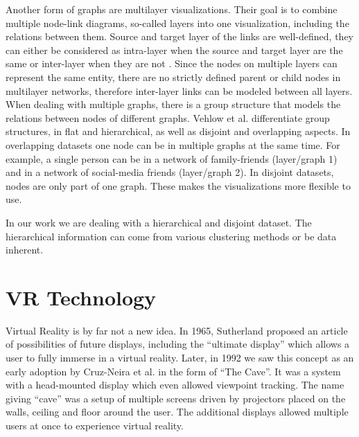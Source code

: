 Another form of graphs are multilayer visualizations\label{exp:multilayer}. Their goal is to combine multiple node-link diagrams, so-called layers into one visualization, including the relations between them. 
Source and target layer of the links are well-defined, they can either be considered as intra-layer when the source and target layer are the same or inter-layer when they are not \cite{ghoniem_state_2019}. 
Since the nodes on multiple layers can represent the same entity, there are no strictly defined parent or child nodes in multilayer networks, therefore inter-layer links can be modeled between all layers.
When dealing with multiple graphs, there is a group structure that models the relations between nodes of different graphs.
Vehlow et al. \cite{vehlow_state_2015} differentiate group structures, in flat and hierarchical, as well as disjoint and overlapping aspects.
In overlapping datasets one node can be in multiple graphs at the same time. For example, a single person can be in a network of family-friends (layer/graph 1) and in a network of social-media friends (layer/graph 2).
In disjoint datasets, nodes are only part of one graph. These makes the visualizations more flexible to use.
\pagebreak

In our work we are dealing with a hierarchical and disjoint dataset. The hierarchical information can come from various clustering methods or be data inherent.

\section{VR Technology}
\label{chap:bg-vrtech}
Virtual Reality is by far not a new idea. In 1965, Sutherland \cite{Sutherland65theultimate} proposed an article of possibilities of future displays, including the “ultimate display” which allows a user to fully immerse in a virtual reality. Later, in 1992 we saw this concept as an early adoption by Cruz-Neira et al. \cite{cruz-neira_cave_1992} in the form of “The Cave”. It was a system with a head-mounted display which even allowed viewpoint tracking. The name giving “cave” was a setup of multiple screens driven by projectors placed on the walls, ceiling and floor around the user. The additional displays allowed multiple users at once to experience virtual reality.  

